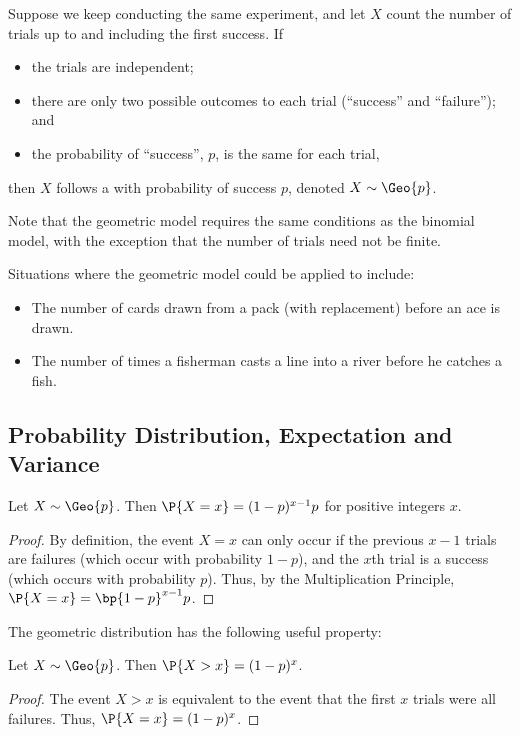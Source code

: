 \begin{definition}
    Suppose we keep conducting the same experiment, and let $X$ count the number of trials up to and including the first success. If
    \begin{itemize}
        \item the trials are independent;
        \item there are only two possible outcomes to each trial (``success'' and ``failure''); and
        \item the probability of ``success'', $p$, is the same for each trial,
    \end{itemize}
    then $X$ follows a  with probability of success $p$, denoted $X \sim \Geo{p}$.
\end{definition}

Note that the geometric model requires the same conditions as the binomial model, with the exception that the number of trials need not be finite.

Situations where the geometric model could be applied to include:
\begin{itemize}
    \item The number of cards drawn from a pack (with replacement) before an ace is drawn.
    \item The number of times a fisherman casts a line into a river before he catches a fish.
\end{itemize}

\subsection{Probability Distribution, Expectation and Variance}

\begin{proposition}
    Let $X \sim \Geo{p}$. Then $\P{X = x} = (1-p)^{x-1} p$ for positive integers $x$.
\end{proposition}
\begin{proof}
    By definition, the event $X = x$ can only occur if the previous $x - 1$ trials are failures (which occur with probability $1-p$), and the $x$th trial is a success (which occurs with probability $p$). Thus, by the Multiplication Principle, $\P{X = x} = \bp{1 - p}^{x-1} p$.
\end{proof}

The geometric distribution has the following useful property:
\begin{proposition}
    Let $X \sim \Geo{p}$. Then $\P{X > x} = (1-p)^x$.
\end{proposition}
\begin{proof}%
    The event $X > x$ is equivalent to the event that the first $x$ trials were all failures. Thus, $\P{X = x} = (1-p)^x$.
\end{proof}

